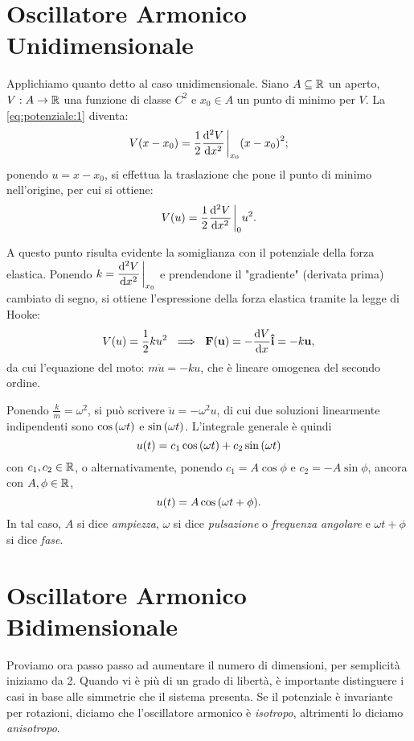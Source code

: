 \section{Oscillatore Armonico Unidimensionale}
    Applichiamo quanto detto al caso unidimensionale. Siano $A\subseteq\mathbb{R}$ un aperto, $V:A\rightarrow\mathbb{R}$ una funzione di classe $C^2$ e $x_0\in A$ un punto di minimo per $V$. La \eqref{eq:potenziale:1} diventa:
        $$V(x-x_0)=\frac{1}{2}\dv[2]{V}{x}\eval_{x_0}\qty(x-x_0)^2;$$
    ponendo $u=x-x_0$, si effettua la traslazione che pone il punto di minimo nell'origine, per cui si ottiene:
        $$V(u)=\frac{1}{2}\dv[2]{V}{x}\eval_{0}u^2.$$
    \par A questo punto risulta evidente la somiglianza con il potenziale della forza elastica. Ponendo $\displaystyle k=\dv[2]{V}{x}\eval_{x_0}$ e prendendone il "gradiente" (derivata prima) cambiato di segno, si ottiene l'espressione della forza elastica tramite la legge di Hooke:
        $$V\qty(u)=\frac{1}{2}ku^2\ \implies\ \vb{F\qty(\vb{u})}=-\dv{V}{x}\vu{i}=-k\vb{u},$$
    da cui l'equazione del moto: $m\ddot{u}=-ku$, che \`e lineare omogenea del secondo ordine.
    \par Ponendo $\frac{k}{m}=\omega^2$, si pu\`o scrivere $\ddot{u}=-\omega^2u$, di cui due soluzioni linearmente indipendenti sono $\cos\qty(\omega t)$ e $\sin\qty(\omega t)$. L'integrale generale \`e quindi $$u\qty(t)=c_1\cos\qty(\omega t)+c_2\sin\qty(\omega t)$$ con $c_1,c_2\in\mathbb{R}$, o alternativamente, ponendo $c_1=A\cos\phi$ e $c_2=-A\sin\phi$, ancora con $A,\phi\in\mathbb{R}$,
        $$u\qty(t)=A\cos\qty(\omega t+\phi).$$
    In tal caso, $A$ si dice \emph{ampiezza}, $\omega$ si dice \emph{pulsazione} o \emph{frequenza angolare} e $\omega t+\phi$ si dice \emph{fase}.
\section{Oscillatore Armonico Bidimensionale}
    Proviamo ora passo passo ad aumentare il numero di dimensioni, per semplicit\`a iniziamo da 2. Quando vi \`e pi\`u di un grado di libert\`a, \`e importante distinguere i casi in base alle simmetrie che il sistema presenta. Se il potenziale \`e invariante per rotazioni, diciamo che l'oscillatore armonico \`e \emph{isotropo}, altrimenti lo diciamo \emph{anisotropo}.
